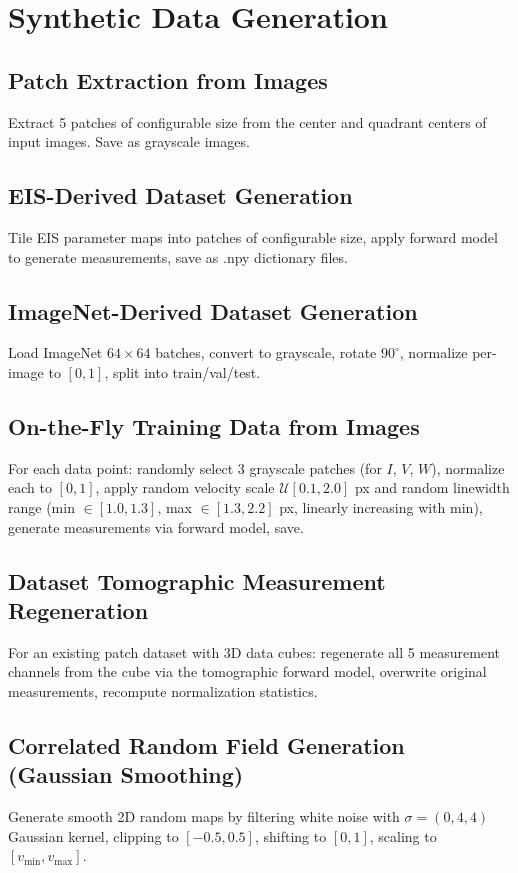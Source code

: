 \documentclass[11pt,a4paper]{article}
\begin{document}
\section{Synthetic Data Generation}

\subsection{Patch Extraction from Images}
Extract 5 patches of configurable size from the center and quadrant centers of input images. Save as grayscale images.

\subsection{EIS-Derived Dataset Generation}
Tile EIS parameter maps into patches of configurable size, apply forward model to generate measurements, save as .npy dictionary files.

\subsection{ImageNet-Derived Dataset Generation}
Load ImageNet $64{\times}64$ batches, convert to grayscale, rotate $90^\circ$, normalize per-image to $[0,1]$, split into train/val/test.

\subsection{On-the-Fly Training Data from Images}
For each data point: randomly select 3 grayscale patches (for $I$, $V$, $W$), normalize each to $[0,1]$, apply random velocity scale $\mathcal{U}[0.1,2.0]$ px and random linewidth range (min $\in [1.0,1.3]$, max $\in [1.3,2.2]$ px, linearly increasing with min), generate measurements via forward model, save.

\subsection{Dataset Tomographic Measurement Regeneration}
For an existing patch dataset with 3D data cubes: regenerate all 5 measurement channels from the cube via the tomographic forward model, overwrite original measurements, recompute normalization statistics.

\subsection{Correlated Random Field Generation (Gaussian Smoothing)}
Generate smooth 2D random maps by filtering white noise with $\sigma=(0,4,4)$ Gaussian kernel, clipping to $[-0.5,0.5]$, shifting to $[0,1]$, scaling to $[v_{\min}, v_{\max}]$.
\end{document}
